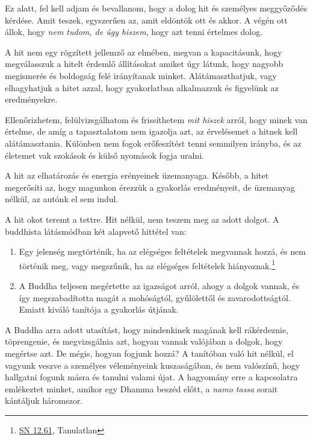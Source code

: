 Ez alatt, fel kell adjam és bevallanom, hogy a dolog hit és személyes
meggyőződés kérdése. Amit teszek, egyszerűen az, amit eldöntök ott és
akkor. A végén ott állok, hogy \emph{nem tudom, de úgy hiszem}, hogy azt
tenni értelmes dolog.

A hit nem egy rögzített jellemző az elmében, megvan a kapacitásunk, hogy
megválasszuk a hitelt érdemlő állításokat amiket úgy látunk, hogy
nagyobb megismerés és boldogság felé irányítanak minket.
Alátámaszthatjuk, vagy elhagyhatjuk a hitet azzal, hogy gyakorlatban
alkalmazzuk és figyelünk az eredményekre.

\clearpage

Ellenőrizhetem, felülvizsgálhatom és frissíthetem \emph{mit hiszek}
arról, hogy minek van értelme, de amíg a tapasztalatom nem igazolja azt,
az érvelésemet a hitnek kell alátámasztania. Különben nem fogok
erőfeszítést tenni semmilyen irányba, és az életemet vak szokások és
külső nyomások fogja uralni.

A hit az elhatározás és energia erényeinek üzemanyaga. Később, a hitet
megerősíti az, hogy magunkon érezzük a gyakorlás eredményeit, de
üzemanyag nélkül, az autónk el sem indul.


A hit okot teremt a tettre. Hit nélkül, nem teszem meg az adott dolgot.
A buddhista látásmódban két alapvető hittétel van:

\begin{enumerate}
\item
  Egy jelenség megtörténik, ha az elégséges feltételek megvannak hozzá,
  és nem történik meg, vagy megszűnik, ha az elégséges feltételek
  hiányoznak.\footnote{\href{https://www.dhammatalks.org/suttas/SN/SN12_61.html}{SN
    12.61}, Tanulatlan}
\item
  A Buddha teljesen megértette az igazságot arról, ahogy a dolgok
  vannak, és így megszabadította magát a mohóságtól, gyűlölettől és
  zavarodottságtól. Emiatt kiváló tanítója a gyakorlás útjának.
\end{enumerate}

A Buddha arra adott utasítást, hogy mindenkinek magának kell
rákérdeznie, töprengenie, és megvizsgálnia azt, hogyan vannak valójában
a dolgok, hogy megértse azt. De mégis, hogyan fogjunk hozzá? A tanítóban
való hit nélkül, el vagyunk veszve a személyes véleményeink
kuszaságában, és nem valószínű, hogy hallgatni fogunk másra és tanulni
valami újat. A hagyomány erre a kapcsolatra emlékeztet minket, amikor
egy Dhamma beszéd előtt, a \emph{namo tassa} sorait kántáljuk háromszor.

